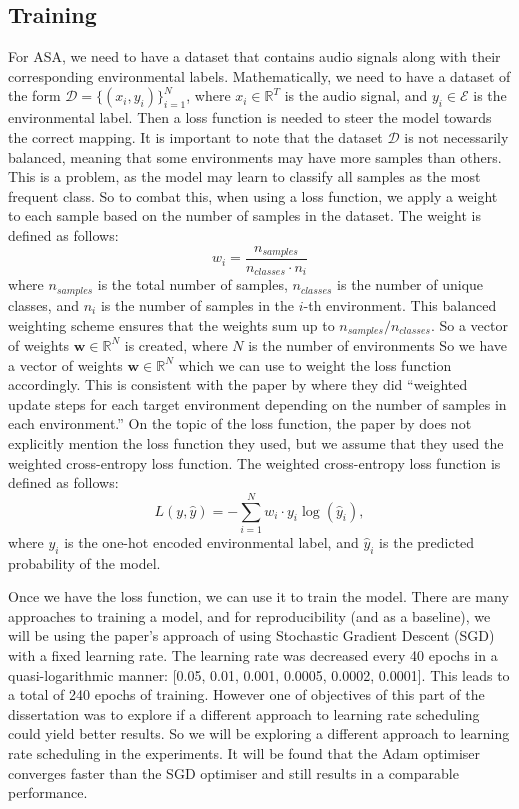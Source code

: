 \documentclass[logo,bsc,singlespacing,parskip,online]{infthesis}
\begin{document}
\subsection{Training}
For ASA, we need to have a dataset that contains audio signals along with their corresponding environmental labels. 
Mathematically, we need to have a dataset of the form \(\mathcal{D} = \{(x_i, y_i)\}_{i=1}^{N}\), where \(x_i \in \mathbb{R}^{T}\) is the audio signal, and \(y_i \in \mathcal{E}\) is the environmental label.
Then a loss function is needed to steer the model towards the correct mapping.
It is important to note that the dataset $\mathcal{D}$ is not necessarily balanced,
meaning that some environments may have more samples than others.
This is a problem, as the model may learn to classify all samples as the most frequent class. 
So to combat this, when using a loss function, we apply a weight to each sample based on the number of samples in the dataset.
The weight is defined as follows:
\[
w_i = \frac{n_{samples}}{n_{classes} \cdot n_i}
\]
where \(n_{samples}\) is the total number of samples, \(n_{classes}\) is the number of unique classes, and \(n_i\) is the number of samples in the \(i\)-th environment.
This balanced weighting scheme ensures that the weights sum up to \(n_{samples}/n_{classes}\).
So a vector of weights \(\mathbf{w} \in \mathbb{R}^{N}\) is created, where \(N\) is the number of environments
So we have a vector of weights \(\mathbf{w} \in \mathbb{R}^{N}\) which we can use to weight the loss function accordingly.
This is consistent with the paper by \citet{Huwel2020HearDS} where they did ``weighted update steps for each target environment depending on the number of samples in each environment.''
On the topic of the loss function, the paper by \citet{Huwel2020HearDS} does 
not explicitly mention the loss function they used, but we assume that they used the weighted cross-entropy loss function.
The weighted cross-entropy loss function is defined as follows:
\[
L(y, \hat{y}) = -\sum_{i=1}^{N} w_i \cdot y_i \log(\hat{y}_i),
\]
where \(y_i\) is the one-hot encoded environmental label, and \(\hat{y}_i\) is the predicted probability of the model.

Once we have the loss function, we can use it to train the model. There are many approaches to training a model,
and for reproducibility (and as a baseline), we will be using the paper's approach of using Stochastic Gradient Descent (SGD) with a fixed learning rate.
The learning rate was decreased every 40 epochs in a quasi-logarithmic manner: [0.05, 0.01, 0.001, 0.0005, 0.0002, 0.0001].
This leads to a total of 240 epochs of training. 
However one of objectives of this part of the dissertation was to explore if a different approach to learning rate scheduling
could yield better results. So we will be exploring a different approach to learning rate scheduling in the experiments.
It will be found that the Adam optimiser converges faster than the SGD optimiser and still results in a comparable 
performance. 
\end{document}

